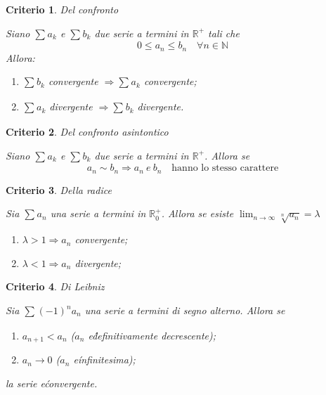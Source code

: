 \documentclass[a4paper, titlepage]{report}%
\theoremstyle{definition} %
\theoremstyle{plain}
\theoremstyle{plain}
\theoremstyle{remark}
\theoremstyle{remark}
\theoremstyle{plain}
\newtheorem*{criterio}{Criterio}
\theoremstyle{plain}
\theoremstyle{plain}
\theoremstyle{plain}
\theoremstyle{plain}
\begin{document}
\begin{criterio}{Del confronto}

    Siano $\sum_{}^{}a_k $ e $\sum_{}^{}b_k $ due serie a termini
    in $\mathbb{R^+}$ tali che
\[
    0 \leq a_n \leq b_n \quad \forall n \in \mathbb{N}    
\]
Allora:
       \begin{enumerate}
    \item $\sum_{}^{}b_k$ convergente $\Longrightarrow \sum_{}^{}a_k $ 
         convergente;
    \item $\sum_{}^{}a_k$ divergente $\Longrightarrow \sum_{}^{}b_k $ 
    divergente.
    
       \end{enumerate} 
\end{criterio}
\begin{criterio}{Del confronto asintontico}

    Siano $\sum_{}^{}a_k $ e $\sum_{}^{}b_k $ due serie a termini
    in $\mathbb{R^+}$. Allora se
\[
      a_n \sim b_n \Longrightarrow a_n \ e \  b_n \quad 
       \text{hanno lo stesso carattere}  
\]
\end{criterio}
\begin{criterio}{Della radice}

    Sia $\sum_{}^{}a_n$ una serie a termini in $\mathbb{R}_0^+$. Allora se esiste
     $\lim_{n \to \infty} \sqrt[n]{a_n} = \lambda$
   \begin{enumerate}
    \item $\lambda > 1 \Longrightarrow a_n $ convergente;
    \item $\lambda < 1 \Longrightarrow a_n $ divergente;
   \end{enumerate}

\end{criterio}
\begin{criterio}{Di Leibniz}

    Sia $\sum_{}^{}(-1)^na_n$ una serie a termini di segno alterno. Allora se
  \begin{enumerate}
    \item $a_{n+1}<a_n$ ($a_n $ e\' definitivamente decrescente);
    \item $a_n \rightarrow 0$ ($a_n$ e\' infinitesima);
  \end{enumerate}
    
  la serie e\' convergente.
\end{criterio}
\end{document}
